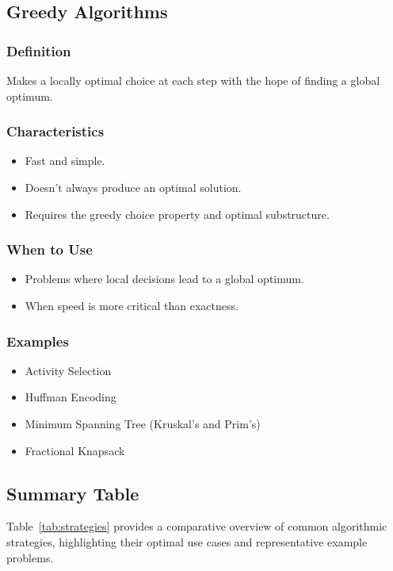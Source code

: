 \documentclass[12pt]{article}
\begin{document}
\subsection{Greedy Algorithms}

\subsubsection{Definition}
Makes a locally optimal choice at each step with the hope of finding a global optimum.

\subsubsection{Characteristics}
\begin{itemize}
    \item Fast and simple.
    \item Doesn’t always produce an optimal solution.
    \item Requires the greedy choice property and optimal substructure.
\end{itemize}

\subsubsection{When to Use}
\begin{itemize}
    \item Problems where local decisions lead to a global optimum.
    \item When speed is more critical than exactness.
\end{itemize}

\subsubsection{Examples}
\begin{itemize}
    \item Activity Selection
    \item Huffman Encoding
    \item Minimum Spanning Tree (Kruskal's and Prim's)
    \item Fractional Knapsack
\end{itemize}

\subsection{Summary Table}
Table~\ref{tab:strategies} provides a comparative overview of common algorithmic strategies, highlighting their optimal use cases and representative example problems.
\end{document}

